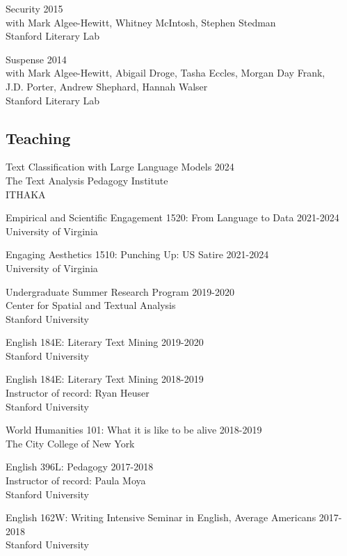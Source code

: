 \documentclass[
  12pt,
  letterpaper,
]{article}
\begin{document}
Security \hfill 2015\\
with Mark Algee-Hewitt, Whitney McIntosh, Stephen
Stedman\\
Stanford Literary Lab

Suspense \hfill 2014\\
with Mark Algee-Hewitt, Abigail Droge, Tasha Eccles,
Morgan Day Frank,\\
J.D. Porter, Andrew Shephard, Hannah Walser\\
Stanford Literary Lab

\hypertarget{teaching}{%
\subsection{Teaching}\label{teaching}}

Text Classification with Large Language Models \hfill 2024\\
The Text Analysis Pedagogy Institute\\
ITHAKA

Empirical and Scientific Engagement 1520: From Language to Data
\hfill 2021-2024\\
University of Virginia

Engaging Aesthetics 1510: Punching Up: US Satire \hfill 2021-2024\\
University of Virginia

Undergraduate Summer Research Program \hfill 2019-2020\\
Center for Spatial and Textual Analysis\\
Stanford University

English 184E: Literary Text Mining \hfill 2019-2020\\
Stanford University

English 184E: Literary Text Mining \hfill 2018-2019\\
Instructor of record: Ryan Heuser\\
Stanford University

World Humanities 101: What it is like to be alive \hfill 2018-2019\\
The City College of New York

English 396L: Pedagogy \hfill 2017-2018\\
Instructor of record: Paula Moya\\
Stanford University

English 162W: Writing Intensive Seminar in English, Average Americans
\hfill 2017-2018\\
Stanford University
\end{document}
